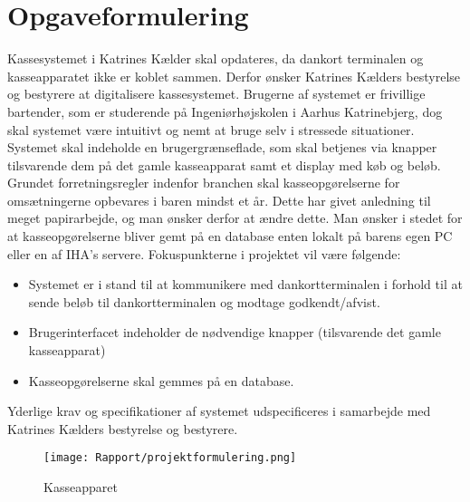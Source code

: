 \chapter{Opgaveformulering}
Kassesystemet i Katrines Kælder skal opdateres, da dankort terminalen og kasseapparatet ikke er koblet sammen. Derfor ønsker Katrines Kælders bestyrelse og bestyrere at digitalisere kassesystemet.
\newline\newline
Brugerne af systemet er frivillige bartender, som er studerende på Ingeniørhøjskolen i Aarhus Katrinebjerg, dog skal systemet være intuitivt og nemt at bruge selv i stressede situationer.
\newline\newline
Systemet skal indeholde en brugergrænseflade, som skal betjenes via knapper tilsvarende dem på det gamle kasseapparat samt et display med køb og beløb. 
\newline\newline
Grundet forretningsregler indenfor branchen skal kasseopgørelserne for omsætningerne opbevares i baren mindst et år. Dette har givet anledning til meget papirarbejde, og man ønsker derfor at ændre dette. Man ønsker i stedet for at kasseopgørelserne bliver gemt på en database enten lokalt på barens egen PC
eller en af \gls{IHA}’s servere.
\newline\newline
Fokuspunkterne i projektet vil være følgende:
\begin{itemize}
\item Systemet er i stand til at kommunikere med dankortterminalen i forhold til at sende beløb til
dankortterminalen og modtage godkendt/afvist.
\item Brugerinterfacet indeholder de nødvendige knapper (tilsvarende det gamle kasseapparat)
\item Kasseopgørelserne skal gemmes på en database.
\newline
\end{itemize}
Yderlige krav og specifikationer af systemet udspecificeres i samarbejde med Katrines Kælders bestyrelse
og bestyrere.

\begin{figure}[h]
    \centering
    \texttt{[image: Rapport/projektformulering.png]}
    \caption{Kasseapparet}
    \label{fig:kasseapparat}
\end{figure}
~\cite{Opgaveformulering}